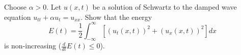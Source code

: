 \documentclass[plain]{pset}
\begin{document}
\pagebreak

\begin{problem}
Choose \(\alpha > 0\). Let \(u(x, t)\) be a solution of Schwartz to the damped wave equation \(u_{tt} + \alpha u_t = u_{xx}\). Show that the energy
\[E(t) = \frac{1}{2}\int_{-\infty}^{\infty} \left[\left(u_t(x, t)\right)^2 + \left(u_x(x, t)\right)^2\right]dx\]
is non-increasing (\(\frac{d}{dt}E(t) \leq 0\)).
\end{problem}
\begin{solution}

\end{solution}
\end{document}
